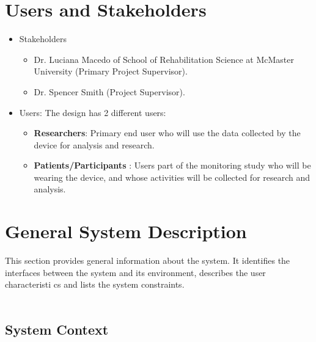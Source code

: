 \documentclass[12pt]{article}
\begin{document}
\section{Users and Stakeholders}
\label{Users_Stakeholders}
\begin{itemize}
\item Stakeholders

	\begin{itemize}
		\item  Dr. Luciana Macedo of School of Rehabilitation Science at McMaster University (Primary Project Supervisor).
		\item  Dr. Spencer Smith (Project Supervisor).
	\end{itemize}

\item Users: The design has 2 different users:
	\begin{itemize}
		\item \textbf{Researchers}: Primary end user who will use the data collected by the device for analysis and research.
		\item \textbf{Patients/Participants} : Users part of the monitoring study who will be wearing the device, and whose activities will be collected for research and analysis.
	\end{itemize}
\end{itemize}

\section{General System Description}
\label{GSD}
This section provides general information about the system.  It identifies the
interfaces between the system and its environment, describes the user
characteristi	cs and lists the system constraints.  \\\\
\subsection{System Context}
\end{document}
